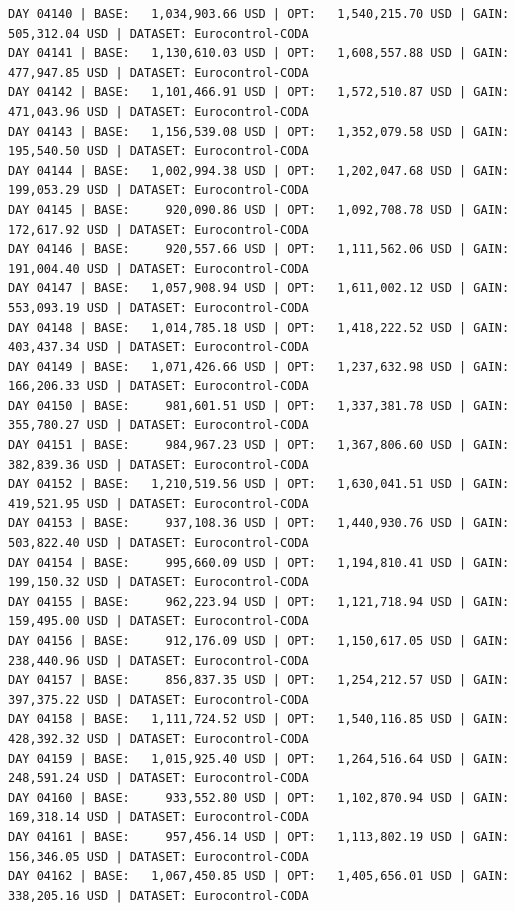\documentclass[11pt,a4paper]{article}
\begin{document}
\begin{verbatim}
DAY 04140 | BASE:   1,034,903.66 USD | OPT:   1,540,215.70 USD | GAIN: 505,312.04 USD | DATASET: Eurocontrol-CODA
DAY 04141 | BASE:   1,130,610.03 USD | OPT:   1,608,557.88 USD | GAIN: 477,947.85 USD | DATASET: Eurocontrol-CODA
DAY 04142 | BASE:   1,101,466.91 USD | OPT:   1,572,510.87 USD | GAIN: 471,043.96 USD | DATASET: Eurocontrol-CODA
DAY 04143 | BASE:   1,156,539.08 USD | OPT:   1,352,079.58 USD | GAIN: 195,540.50 USD | DATASET: Eurocontrol-CODA
DAY 04144 | BASE:   1,002,994.38 USD | OPT:   1,202,047.68 USD | GAIN: 199,053.29 USD | DATASET: Eurocontrol-CODA
DAY 04145 | BASE:     920,090.86 USD | OPT:   1,092,708.78 USD | GAIN: 172,617.92 USD | DATASET: Eurocontrol-CODA
DAY 04146 | BASE:     920,557.66 USD | OPT:   1,111,562.06 USD | GAIN: 191,004.40 USD | DATASET: Eurocontrol-CODA
DAY 04147 | BASE:   1,057,908.94 USD | OPT:   1,611,002.12 USD | GAIN: 553,093.19 USD | DATASET: Eurocontrol-CODA
DAY 04148 | BASE:   1,014,785.18 USD | OPT:   1,418,222.52 USD | GAIN: 403,437.34 USD | DATASET: Eurocontrol-CODA
DAY 04149 | BASE:   1,071,426.66 USD | OPT:   1,237,632.98 USD | GAIN: 166,206.33 USD | DATASET: Eurocontrol-CODA
DAY 04150 | BASE:     981,601.51 USD | OPT:   1,337,381.78 USD | GAIN: 355,780.27 USD | DATASET: Eurocontrol-CODA
DAY 04151 | BASE:     984,967.23 USD | OPT:   1,367,806.60 USD | GAIN: 382,839.36 USD | DATASET: Eurocontrol-CODA
DAY 04152 | BASE:   1,210,519.56 USD | OPT:   1,630,041.51 USD | GAIN: 419,521.95 USD | DATASET: Eurocontrol-CODA
DAY 04153 | BASE:     937,108.36 USD | OPT:   1,440,930.76 USD | GAIN: 503,822.40 USD | DATASET: Eurocontrol-CODA
DAY 04154 | BASE:     995,660.09 USD | OPT:   1,194,810.41 USD | GAIN: 199,150.32 USD | DATASET: Eurocontrol-CODA
DAY 04155 | BASE:     962,223.94 USD | OPT:   1,121,718.94 USD | GAIN: 159,495.00 USD | DATASET: Eurocontrol-CODA
DAY 04156 | BASE:     912,176.09 USD | OPT:   1,150,617.05 USD | GAIN: 238,440.96 USD | DATASET: Eurocontrol-CODA
DAY 04157 | BASE:     856,837.35 USD | OPT:   1,254,212.57 USD | GAIN: 397,375.22 USD | DATASET: Eurocontrol-CODA
DAY 04158 | BASE:   1,111,724.52 USD | OPT:   1,540,116.85 USD | GAIN: 428,392.32 USD | DATASET: Eurocontrol-CODA
DAY 04159 | BASE:   1,015,925.40 USD | OPT:   1,264,516.64 USD | GAIN: 248,591.24 USD | DATASET: Eurocontrol-CODA
DAY 04160 | BASE:     933,552.80 USD | OPT:   1,102,870.94 USD | GAIN: 169,318.14 USD | DATASET: Eurocontrol-CODA
DAY 04161 | BASE:     957,456.14 USD | OPT:   1,113,802.19 USD | GAIN: 156,346.05 USD | DATASET: Eurocontrol-CODA
DAY 04162 | BASE:   1,067,450.85 USD | OPT:   1,405,656.01 USD | GAIN: 338,205.16 USD | DATASET: Eurocontrol-CODA

\end{verbatim}
\end{document}
